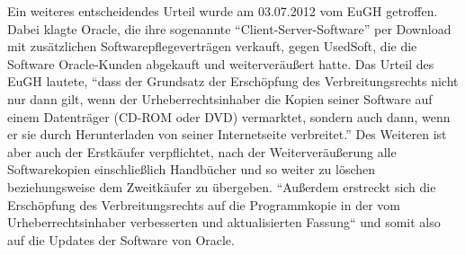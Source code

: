 Ein weiteres entscheidendes Urteil wurde am 03.07.2012 vom EuGH getroffen. Dabei klagte Oracle, die ihre sogenannte “Client-Server-Software” per Download mit zusätzlichen
Softwarepflegeverträgen verkauft, gegen UsedSoft, die die Software Oracle-Kunden abgekauft und weiterveräußert hatte. Das Urteil des EuGH lautete, “dass der Grundsatz der
Erschöpfung des Verbreitungsrechts nicht nur dann gilt, wenn der Urheberrechtsinhaber die Kopien seiner Software auf einem Datenträger (CD-ROM oder DVD) vermarktet, sondern auch dann,
wenn er sie durch Herunterladen von seiner Internetseite verbreitet.” Des Weiteren ist aber auch der Erstkäufer verpflichtet, nach der Weiterveräußerung alle Softwarekopien
einschließlich Handbücher und so weiter zu löschen beziehungsweise dem Zweitkäufer  zu übergeben. “Außerdem erstreckt sich die Erschöpfung des Verbreitungsrechts auf die
Programmkopie in der vom Urheberrechtsinhaber verbesserten und aktualisierten Fassung“ und somit also auf die Updates der Software von Oracle.  
